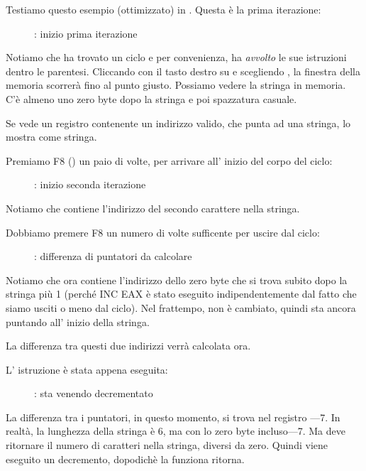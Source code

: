 ﻿\clearpage
{}
\myindex{\olly}

Testiamo questo esempio (ottimizzato) in \olly.  Questa è la prima iterazione:

\begin{figure}[H]
\centering
{}
\caption{\olly: inizio prima iterazione}
\label{fig:strlen_olly_1}
\end{figure}

Notiamo che \olly ha trovato un ciclo e per convenienza, ha \emph{avvolto} le sue istruzioni dentro le parentesi.
Cliccando con il tasto destro su \EAX e scegliendo 
, la finestra della memoria scorrerà fino al punto giusto.
Possiamo vedere la stringa  in memoria.
C'è almeno
uno zero byte dopo la stringa e poi spazzatura casuale.

Se \olly vede un registro contenente un indirizzo valido, che punta ad una stringa,  
lo mostra come stringa.

\clearpage
Premiamo F8 (\stepover) un paio di volte, per arrivare all' inizio del corpo del ciclo:

\begin{figure}[H]
\centering
{}
\caption{\olly: inizio seconda iterazione}
\label{fig:strlen_olly_2}
\end{figure}

Notiamo che \EAX contiene l'indirizzo del secondo carattere nella stringa.

\clearpage

Dobbiamo premere F8 un numero di volte sufficente per uscire dal ciclo:

\begin{figure}[H]
\centering
{}
\caption{\olly: differenza di puntatori da calcolare}
\label{fig:strlen_olly_3}
\end{figure}

Notiamo che ora \EAX contiene l'indirizzo dello zero byte che si trova subito dopo la stringa più 1 (perché INC EAX è stato eseguito indipendentemente dal fatto che siamo usciti o meno dal ciclo).
Nel frattempo, \EDX non è cambiato,
quindi sta ancora puntando all' inizio della stringa.

La differenza tra questi due indirizzi verrà calcolata ora.

\clearpage
L' istruzione \SUB è stata appena eseguita:

\begin{figure}[H]
\centering
{}
\caption{\olly: \EAX  sta venendo decrementato}
\label{fig:strlen_olly_4}
\end{figure}

La differenza tra i puntatori, in questo momento, si trova nel registro \EAX---7.
In realtà, la lunghezza della stringa  è 6, 
ma con lo zero byte incluso---7.
Ma  deve ritornare il numero di caratteri nella stringa, diversi da zero.
Quindi viene eseguito un decremento, dopodichè la funziona ritorna.
